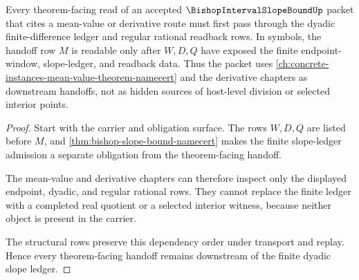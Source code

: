 \begin{theorem}
\label{thm:bishop-slope-bound-mean-value-handoff}
Every theorem-facing read of an accepted $\BishopIntervalSlopeBoundUp$ packet that cites a mean-value or derivative route must first pass through the dyadic finite-difference ledger and regular rational readback rows. In symbols, the handoff row $M$ is readable only after $W,D,Q$ have exposed the finite endpoint-window, slope-ledger, and readback data. Thus the packet uses \autoref{ch:concrete-instances-mean-value-theorem-namecert} and the derivative chapters as downstream handoffs, not as hidden sources of host-level division or selected interior points.
\end{theorem}
\begin{proof}
Start with the carrier and obligation surface. The rows $W,D,Q$ are listed before $M$, and \autoref{thm:bishop-slope-bound-namecert} makes the finite slope-ledger admission a separate obligation from the theorem-facing handoff.

The mean-value and derivative chapters can therefore inspect only the displayed endpoint, dyadic, and regular rational rows. They cannot replace the finite ledger with a completed real quotient or a selected interior witness, because neither object is present in the carrier.

The structural rows preserve this dependency order under transport and replay. Hence every theorem-facing handoff remains downstream of the finite dyadic slope ledger.
\end{proof}




